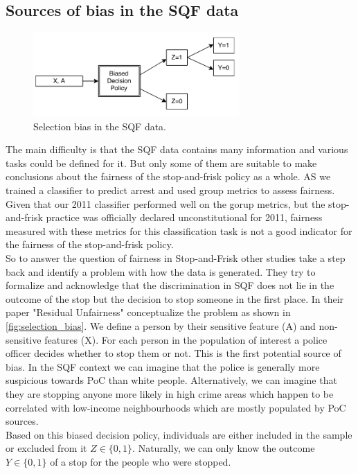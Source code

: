 
\subsection*{Sources of bias in the SQF data}
\begin{figure}
    \includegraphics[width=0.7\textwidth]{../figures/selection_bias.png}
    \caption{Selection bias in the SQF data.}
    \label{fig:selection_bias}
\end{figure}
The main difficulty is that the SQF data contains many information and various tasks could be defined for it. But only some of them are suitable to make conclusions about the fairness of the stop-and-frisk policy as a whole. AS \cite{Badr2022DTFANSP} we trained a classifier to predict arrest and used group metrics to assess fairness. Given that our 2011 classifier performed well on the gorup metrics, but the stop-and-frisk practice was officially declared unconstitutional for 2011, fairness measured with these metrics for this classification task is not a good indicator for the fairness of the stop-and-frisk policy.\\
So to answer the question of fairness in Stop-and-Frisk other studies take a step back and identify a problem with how the data is generated. They try to formalize and acknowledge that the discrimination in SQF does not lie in the outcome of the stop but the decision to stop someone in the first place. In their paper "Residual Unfairness" \cite{kallus2018} conceptualize the problem as shown in \autoref{fig:selection_bias}.
We define a person by their sensitive feature (A) and non-sensitive features (X). For each person in the population of interest a police officer decides whether to stop them or not. This is the first potential source of bias. In the SQF context we can imagine that the police is generally more suspicious towards PoC than white people. Alternatively, we can imagine that they are stopping anyone more likely in high crime areas which happen to be correlated with low-income neighbourhoods which are mostly populated by PoC {\color{red}sources}. \\
Based on this biased decision policy, individuals are either included in the sample or excluded from it $Z \in \{0,1\}$.  Naturally, we can only know the outcome $Y \in \{0, 1\}$ of a stop for the people who were stopped.
